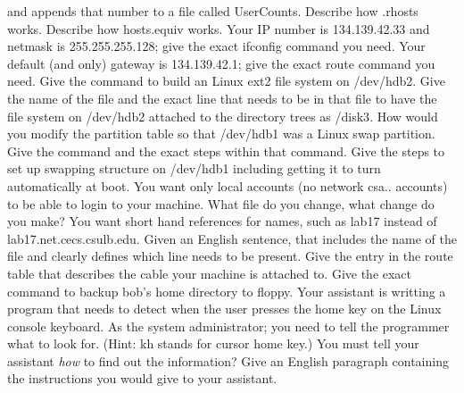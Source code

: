 and appends that number to a file called {\ltt{}UserCounts}.
\vskip 1.0in
\ques
Describe how {\ltt{}.rhosts} works.
\vskip 0.9in
Describe how {\ltt{}hosts.equiv} works.
\vskip 1.1in
Your IP number is 134.139.42.33 and netmask is 255.255.255.128;
give the exact {\ltt{}ifconfig} command you need.
\vskip 0.4in
Your default (and only) gateway is 134.139.42.1;
give the exact {\ltt{}route} command you need.
\vskip 0.4in
\ques
Give the command to build an Linux ext2 file system on {\ltt{}/dev/hdb2}.
\vskip 0.6in
Give the name of the file and the exact line that needs to be in that file to
have the file system on {\ltt{}/dev/hdb2} attached to the directory trees
as {\ltt{}/disk3}.
\vskip 0.6in
How would you modify the partition table so that {\ltt{}/dev/hdb1} was
a Linux swap partition.
Give the command and the exact steps within that command.
\vskip 1.6in
\vfill\eject
\ques
Give the steps to set up swapping structure on {\ltt{}/dev/hdb1}
including getting it to turn automatically at boot.
\vskip 1.5in
\ques
You want only local accounts (no network {\lt{}csa..} accounts) to be
able to login to your machine.
What file do you change, what change do you make?
\vskip 0.5in
You want short hand references for names, such as
{\ltt{}lab17} instead of {\ltt{}lab17.net.cecs.csulb.edu}.
Given an English sentence, that includes the name of the
file and clearly defines which line needs to be present.
\vskip 1.2in
Give the entry in the route table that describes the cable
your machine is attached to.
\vskip 0.5in
\ques
Give the exact command to backup bob's home directory
to floppy.
\vskip 0.4in
Your assistant is writting a program that needs to detect
when the user presses the home key on the Linux console
keyboard.
As the system administrator; you need to tell the programmer
what to look for.
(Hint: kh stands for cursor home key.)
You must tell your assistant {\it how}  to find out the information?
Give an English paragraph containing the instructions you would
give to your assistant.
\vskip 1.5in
\bye
